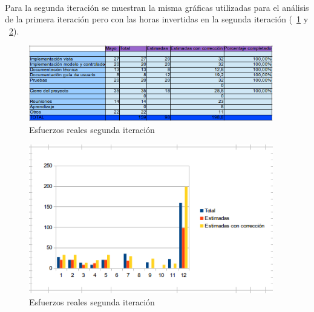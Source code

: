 \paragraph{} Para la segunda iteración se muestran la misma gráficas utilizadas para el análisis de la primera iteración pero con las horas invertidas en la segunda iteración (~\cref{fig:6163} y ~\cref{fig:6164}).

\begin{figure}[h!]
\centering
\includegraphics[width=0.95\textwidth]{img/6163}
\caption{Esfuerzos reales segunda iteración}
 \label{fig:6163}
\end{figure}

\begin{figure}[h!]
\centering
\includegraphics[width=0.95\textwidth]{img/6164}
\caption{Esfuerzos reales segunda iteración}
 \label{fig:6164}
\end{figure}